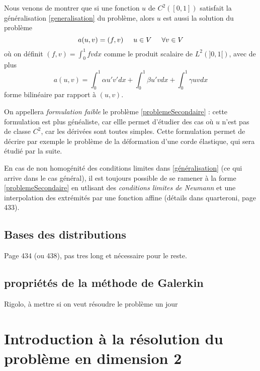 \documentclass[12pt]{article}
\newcommand{\espace}{\hspace{5mm}}
\begin{document}
Nous venons de montrer que si une fonction $u$ de $C^2([0,1])$ satisfait la généralisation \eqref{generalisation} du problème, alors $u$ est aussi la solution du problème
\begin{equation} \label{problemeSecondaire}
a(u,v) = (f,v) \espace u \in V \espace \forall v \in V
\end{equation}
où on définit $(f,v) = \int_0^1 fv dx$ comme le produit scalaire de $L^2(]0,1[)$, avec de plus
\begin{equation}
a(u,v) = \int_0^1 \alpha u' v' dx + \int_0^1 \beta u' v dx + \int_0^1 \gamma u v dx
\end{equation}
forme bilinéaire par rapport à $(u,v)$.

On appellera \emph{formulation faible} le problème \eqref{problemeSecondaire} : cette formulation est plus généaliste, car ellle permet d'étudier des cas où $u$ n'est pas de classe $C^2$, car les dérivées sont toutes simples. Cette formulation permet de décrire par exemple le problème de la déformation d'une corde élastique, qui sera étudié par la suite.

En cas de non homogénité des conditions limites dans \eqref{généralisation} (ce qui arrive dans le cas général), il est toujours possible de se ramener à la forme \eqref{problemeSecondaire} en utlisant des \emph{conditions limites de Neumann} et une interpolation des extrémités par une fonction affine (détails dans quarteroni, page 433).

\subsection{Bases des distributions}

Page 434 (ou 438), pas tres long et nécessaire pour le reste.

\subsection{propriétés de la méthode de Galerkin}
Rigolo, à mettre si on veut résoudre le problème un jour









\section{Introduction à la résolution du problème en dimension 2}
\end{document}
